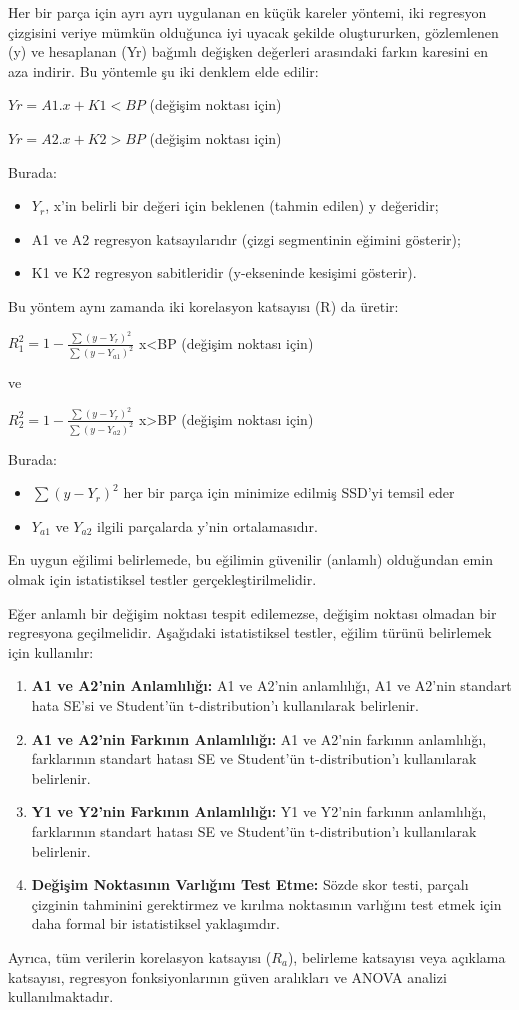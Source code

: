 \documentclass[12pt,twoside]{deuthesis}
\begin{document}
Her bir parça için ayrı ayrı uygulanan en küçük kareler yöntemi, iki regresyon çizgisini veriye mümkün olduğunca iyi uyacak şekilde oluştururken, gözlemlenen (y) ve hesaplanan (Yr) bağımlı değişken değerleri arasındaki farkın karesini en aza indirir. Bu yöntemle şu iki denklem elde edilir:

\(Yr = A1.x+K1 <BP\) (değişim noktası için)

\(Yr = A2.x+K2 >BP\) (değişim noktası için)

Burada:
\begin{itemize}
\item $Y_{r}$, x'in belirli bir değeri için beklenen (tahmin edilen) y değeridir;
\item A1 ve A2 regresyon katsayılarıdır (çizgi segmentinin eğimini gösterir);
\item K1 ve K2 regresyon sabitleridir (y-ekseninde kesişimi gösterir).
\end{itemize}
Bu yöntem aynı zamanda iki korelasyon katsayısı (R) da üretir:

\(R_{1}^{2}=1-{\frac {\sum (y-Y_{r})^{2}}{\sum (y-Y_{a1})^{2}}}\) x\textless BP (değişim noktası için)

ve

\(R_{2}^{2}=1-{\frac {\sum (y-Y_{r})^{2}}{\sum (y-Y_{a2})^{2}}}\) x\textgreater BP (değişim noktası için)

Burada:
\begin{itemize}
\item $\sum (y-Y_{r})^{2}$  her bir parça için minimize edilmiş SSD'yi temsil eder
\item $Y_{a1}$ ve $Y_{a2}$ ilgili parçalarda y'nin ortalamasıdır.
\end{itemize}
En uygun eğilimi belirlemede, bu eğilimin güvenilir (anlamlı) olduğundan emin olmak için istatistiksel testler gerçekleştirilmelidir.

Eğer anlamlı bir değişim noktası tespit edilemezse, değişim noktası olmadan bir regresyona geçilmelidir.
Aşağıdaki istatistiksel testler, eğilim türünü belirlemek için kullanılır:
\begin{enumerate}
\item\textbf{A1 ve A2'nin Anlamlılığı:} A1 ve A2'nin anlamlılığı, A1 ve A2'nin standart hata SE'si ve Student'ün t-distribution'ı kullanılarak belirlenir.
\item\textbf{A1 ve A2'nin Farkının Anlamlılığı:} A1 ve A2'nin farkının anlamlılığı, farklarının standart hatası SE ve Student'ün t-distribution'ı kullanılarak belirlenir.
\item\textbf{Y1 ve Y2'nin Farkının Anlamlılığı:} Y1 ve Y2'nin farkının anlamlılığı, farklarının standart hatası SE ve Student'ün t-distribution'ı kullanılarak belirlenir.
\item\textbf{Değişim Noktasının Varlığını Test Etme:} Sözde skor testi, parçalı çizginin tahminini gerektirmez ve kırılma noktasının varlığını test etmek için daha formal bir istatistiksel yaklaşımdır.
\end{enumerate}
Ayrıca, tüm verilerin korelasyon katsayısı (\(R_{a}\)), belirleme katsayısı veya açıklama katsayısı, regresyon fonksiyonlarının güven aralıkları ve ANOVA analizi kullanılmaktadır.
\end{document}
